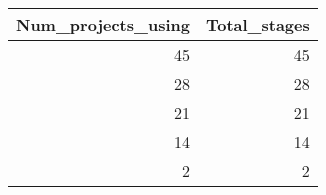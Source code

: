 \begin{tabular}{rr}
\toprule
 Num\_projects\_using &  Total\_stages \\
\midrule
                 45 &            45 \\
                 28 &            28 \\
                 21 &            21 \\
                 14 &            14 \\
                  2 &             2 \\
\bottomrule
\end{tabular}
